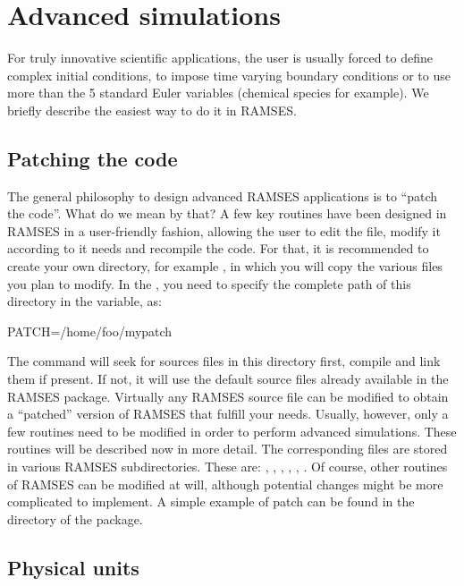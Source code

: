 \clearpage
\section{Advanced simulations}

For truly innovative scientific applications, the user is usually forced to
define complex initial conditions, to impose time varying boundary conditions
or to use more than the 5 standard Euler variables (chemical species for
example).  We briefly describe the easiest way to do it in RAMSES.

\subsection{Patching the code}

The general philosophy to design advanced RAMSES applications is to ``patch the
code''. What do we mean by that? A few key routines have been designed in
RAMSES in a user-friendly fashion, allowing the user to edit the file,
modify it according to it needs and recompile the code. For that, it is
recommended to create your own directory, for example , in which
you will copy the various files you plan to modify. In the , you
need to specify the complete path of this directory in the 
variable, as:
%
\begin{Prompt}
PATCH=/home/foo/mypatch
\end{Prompt}
%
The  command will seek for sources files in this directory first,
compile and link them if present. If not, it will use the default source
files already available in the RAMSES package. Virtually any RAMSES source file
can be modified to obtain a ``patched'' version of RAMSES that fulfill your
needs. Usually, however, only a few routines need to be modified in order to
perform advanced simulations.  These routines will be described now in more
detail. The corresponding files are stored in various RAMSES subdirectories.
These are: , ,
, ,
, . Of course, other
routines of RAMSES can be modified at will, although potential changes might be
more complicated to implement. A simple example of patch can be found in the
directory  of the package.

\subsection{Physical units}

